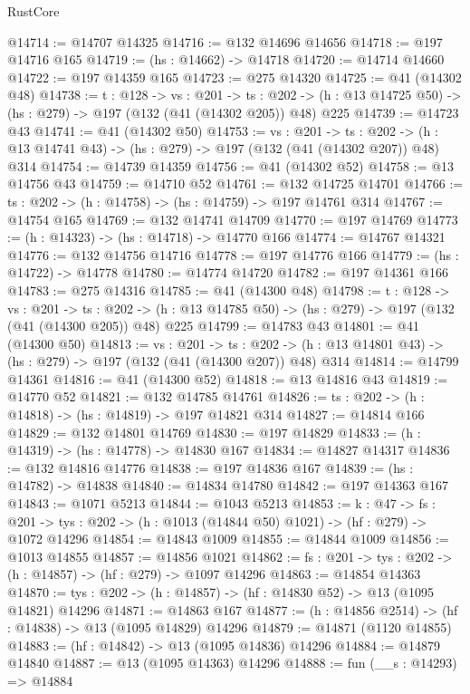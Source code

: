 \begin{lexlean}{RustCore}
\begin{coremodule}
@14714 := @14707 @14325
@14716 := @132 @14696 @14656
@14718 := @197 @14716 @165
@14719 := (hs : @14662) -> @14718
@14720 := @14714 @14660
@14722 := @197 @14359 @165
@14723 := @275 @14320
@14725 := @41 (@14302 @48)
@14738 := {t : @128} ->
  {vs : @201} ->
  {ts : @202} -> (h : @13 @14725 @50) -> (hs : @279) -> @197 (@132 (@41 (@14302 @205)) @48) @225
@14739 := @14723 @43
@14741 := @41 (@14302 @50)
@14753 := {vs : @201} ->
  {ts : @202} -> (h : @13 @14741 @43) -> (hs : @279) -> @197 (@132 (@41 (@14302 @207)) @48) @314
@14754 := @14739 @14359
@14756 := @41 (@14302 @52)
@14758 := @13 @14756 @43
@14759 := @14710 @52
@14761 := @132 @14725 @14701
@14766 := {ts : @202} -> (h : @14758) -> (hs : @14759) -> @197 @14761 @314
@14767 := @14754 @165
@14769 := @132 @14741 @14709
@14770 := @197 @14769
@14773 := (h : @14323) -> (hs : @14718) -> @14770 @166
@14774 := @14767 @14321
@14776 := @132 @14756 @14716
@14778 := @197 @14776 @166
@14779 := (hs : @14722) -> @14778
@14780 := @14774 @14720
@14782 := @197 @14361 @166
@14783 := @275 @14316
@14785 := @41 (@14300 @48)
@14798 := {t : @128} ->
  {vs : @201} ->
  {ts : @202} -> (h : @13 @14785 @50) -> (hs : @279) -> @197 (@132 (@41 (@14300 @205)) @48) @225
@14799 := @14783 @43
@14801 := @41 (@14300 @50)
@14813 := {vs : @201} ->
  {ts : @202} -> (h : @13 @14801 @43) -> (hs : @279) -> @197 (@132 (@41 (@14300 @207)) @48) @314
@14814 := @14799 @14361
@14816 := @41 (@14300 @52)
@14818 := @13 @14816 @43
@14819 := @14770 @52
@14821 := @132 @14785 @14761
@14826 := {ts : @202} -> (h : @14818) -> (hs : @14819) -> @197 @14821 @314
@14827 := @14814 @166
@14829 := @132 @14801 @14769
@14830 := @197 @14829
@14833 := (h : @14319) -> (hs : @14778) -> @14830 @167
@14834 := @14827 @14317
@14836 := @132 @14816 @14776
@14838 := @197 @14836 @167
@14839 := (hs : @14782) -> @14838
@14840 := @14834 @14780
@14842 := @197 @14363 @167
@14843 := @1071 @5213
@14844 := @1043 @5213
@14853 := {k : @47} ->
  {fs : @201} -> {tys : @202} -> (h : @1013 (@14844 @50) @1021) -> (hf : @279) -> @1072 @14296
@14854 := @14843 @1009
@14855 := @14844 @1009
@14856 := @1013 @14855
@14857 := @14856 @1021
@14862 := {fs : @201} -> {tys : @202} -> (h : @14857) -> (hf : @279) -> @1097 @14296
@14863 := @14854 @14363
@14870 := {tys : @202} -> (h : @14857) -> (hf : @14830 @52) -> @13 (@1095 @14821) @14296
@14871 := @14863 @167
@14877 := (h : @14856 @2514) -> (hf : @14838) -> @13 (@1095 @14829) @14296
@14879 := @14871 (@1120 @14855)
@14883 := (hf : @14842) -> @13 (@1095 @14836) @14296
@14884 := @14879 @14840
@14887 := @13 (@1095 @14363) @14296
@14888 := fun (__s : @14293) => @14884

\end{coremodule}
\end{lexlean}
